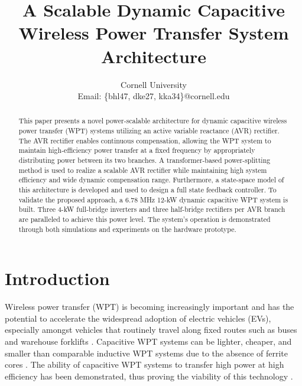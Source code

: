 \documentclass[conference, twocolumn, letterpaper]{IEEEtran}
\title{\singlespacing \fontsize{24}{29} A Scalable Dynamic Capacitive Wireless Power Transfer System Architecture}
\author{
    \IEEEauthorblockN{Ben Liao, Dheeraj Etta, Khurram K. Afridi}
\IEEEauthorblockA{Department of Electrical and Computer Engineering}
        Cornell University \\
        Email: \{bhl47, dke27, kka34\}@cornell.edu
}
\begin{document}
\maketitle

\vspace{-0.85cm}
\begin{abstract}
This paper presents a novel power-scalable architecture for dynamic capacitive wireless power transfer (WPT) systems utilizing an active variable reactance (AVR) rectifier. The AVR rectifier enables continuous compensation, allowing the WPT system to maintain high-efficiency power transfer at a fixed frequency by appropriately distributing power between its two branches. A transformer-based power-splitting method is used to realize a scalable AVR rectifier while maintaining high system efficiency and wide dynamic compensation range. Furthermore, a state-space model of this architecture is developed and used to design a full state feedback controller. To validate the proposed approach, a 6.78 MHz 12-kW dynamic capacitive WPT system is built. Three 4-kW full-bridge inverters and three half-bridge rectifiers per AVR branch are paralleled to achieve this power level. The system's operation is demonstrated through both simulations and experiments on the hardware prototype.
\end{abstract}

\vspace{0.5cm}

\section{Introduction}

Wireless power transfer (WPT) is becoming increasingly important and has the potential to accelerate the widespread adoption of electric vehicles (EVs), especially amongst vehicles that routinely travel along fixed routes such as buses and warehouse forklifts \cite{2015_Miller_Journal, 2018_Regensburger_COMPEL}. Capacitive WPT systems can be lighter, cheaper, and smaller than comparable inductive WPT systems due to the absence of ferrite cores \cite{2013_Covic_Journal}. The ability of capacitive WPT systems to transfer high power at high efficiency has been demonstrated, thus proving the viability of this technology \cite{2025_Etta_APEC}.
\end{document}

